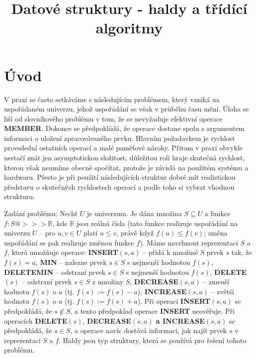 \documentclass[a4paper,12pt]{article}
\def \emph#1{\underbar{#1}}
\DeclareMathOperator*{\Prob}{Prob}
\begin{document}
     

\newtheorem*{dusledek}{Důsledek}
\newtheorem*{lemma}{Lemma}
\newtheorem*{veta}{Věta}
\newtheorem*{tvrzeni}{Tvrzení}

\def \emph#1{\underbar{#1}}
\def \Prob{\operatorname{Prob}}
\def \var{\operatorname{var}}

\title{Datové struktury - haldy a třídící algoritmy}
\date{}
\maketitle

\section{Úvod}

V praxi se často setkáváme s následujícím 
problémem, který vzniká na uspořádaném univerzu, jehož 
uspořádání se však v průběhu času mění. Úloha se 
liší od slovníkového problému v tom, že se nevyžaduje  
efektivní operace {\bf MEMBER}. Dokonce se předpokládá, že ope\-race 
dostane spolu s argumentem informaci o uložení 
zpracovávaného prvku. 
Hlav\-ním požadavkem je rychlost provedední ostatních operací a malé 
paměťové nároky. Přitom v praxi obvykle nestačí znát jen 
asymptotickou složitost, důležitou roli hraje skutečná 
rychlost, kterou však neumíme obecně spočítat, protože je závislá na 
použitém systému a hardwaru. Přesto je při použití 
následujících struktur dobré mít realistickou představu o 
skutečných rychlostech operací a podle toho si vybrat 
vhodnou strukturu. 

Zadání problému: Nechť $U$ je univerzum. Je dána množina 
$S\subseteq U$ a funkce $f:S@>>>\mathbb R$, kde $\mathbb R$ jsou reálná čísla (tato 
funkce realizuje uspořádání na univerzu $U$ -- pro $u,
v\in U$ platí 
$u\le v$, právě když $f(u)\le f(v)$; změna uspořádání se pak realizuje 
změnou funkce $f$).
Máme navrhnout reprezentaci $S$ a $f$, která umožňuje 
operace:\newline 
{\bf INSERT$(s,a)$} -- přidá k množině $S$ prvek $s$ tak, že 
$f(s)=a$,\newline 
{\bf MIN} -- nalezne prvek $s\in S$ s nejmenší hodnotou 
$f(s)$,\newline 
{\bf DELETEMIN} -- odstraní prvek $s\in S$ s nejmenší hodnotou 
$f(s)$,\newline 
{\bf DELETE$(s)$} -- odstraní prvek $s\in S$ z množiny $S$,\newline 
{\bf DECREASE$(s,a)$} -- zmenší hodnotu $f(s)$ o $a$ (tj. 
$f(s):=f(s)-a$),\newline 
{\bf INCREASE$(s,a)$} -- zvětší hodnotu $f(s)$ o $a$ (tj. 
$f(s):=f(s)+a$).\newline 
Při operaci {\bf INSERT$(s,a)$} se předpokládá, že $
s\notin S$, a tento 
předpoklad operace {\bf INSERT} neověřuje. Při operacích {\bf DE\-LE\-TE$
(s)$},
{\bf DECREASE$(s,a)$ a INCREASE$(s,a)$} se před\-pokládá, že $
s\in S$, 
a operace navíc dostává informaci, jak najít  
prvek $s$ v reprezentaci $S$ a $f$. Haldy jsou typ 
struktury, která se používá pro řešení tohoto problému. 
\end{document}
